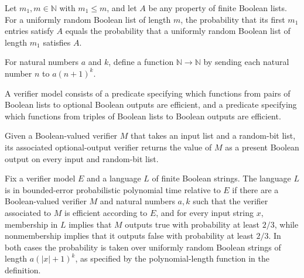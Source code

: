 \begin{theorem}
\label{Randomized.randProb_take}
\leanok
{}
Let $m_1,m\in\mathbb{N}$ with $m_1\le m$, and let $A$ be any property of finite Boolean
lists. For a uniformly random Boolean list of length $m$, the probability that its first
$m_1$ entries satisfy $A$ equals the probability that a uniformly random Boolean list of
length $m_1$ satisfies $A$.
\end{theorem}

\begin{definition}
\label{Randomized.polyLen}
\leanok
For natural numbers $a$ and $k$, define a function $\mathbb{N} \to \mathbb{N}$ by
sending each natural number $n$ to $a(n+1)^k$.
\end{definition}

\begin{definition}
\label{Randomized.VerifierModel}
\leanok
A verifier model consists of a predicate specifying which functions from pairs of
Boolean lists to optional Boolean outputs are efficient, and a predicate specifying
which functions from triples of Boolean lists to Boolean outputs are efficient.
\end{definition}

\begin{definition}
\label{Randomized.boolVerifier}
\leanok
Given a Boolean-valued verifier $M$ that takes an input list and a random-bit list, its
associated optional-output verifier returns the value of $M$ as a present Boolean output
on every input and random-bit list.
\end{definition}

\begin{definition}
\label{Randomized.InBPP}
\leanok
{}
Fix a verifier model $E$ and a language $L$ of finite Boolean strings. The language $L$
is in bounded-error probabilistic polynomial time relative to $E$ if there are a
Boolean-valued verifier $M$ and natural numbers $a,k$ such that the verifier associated
to $M$ is efficient according to $E$, and for every input string $x$, membership in $L$
implies that $M$ outputs true with probability at least $2/3$, while nonmembership
implies that it outputs false with probability at least $2/3$. In both cases the
probability is taken over uniformly random Boolean strings of length $a(|x|+1)^k$,
as specified by the polynomial-length function in the definition.
\end{definition}

